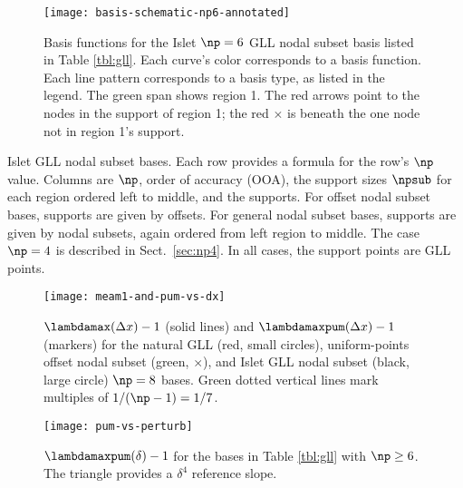 \begin{figure}[tbh]
  \centering
  \texttt{[image: basis-schematic-np6-annotated]}
  \caption{
    Basis functions for the Islet $\np=6$ GLL nodal subset basis listed in Table \ref{tbl:gll}.
    Each curve's color corresponds to a basis function.
    Each line pattern corresponds to a basis type, as listed in the legend.
    The green span shows region 1.
    The red arrows point to the nodes in the support of region 1;
    the red $\times$ is beneath the one node not in region 1's support.
  }
  \label{fig:np6-basis}
\end{figure}

\begin{table}[tbh]
  
  \caption{
    Islet GLL nodal subset bases.
    Each row provides a formula for the row's $\np$ value.
    Columns are $\np$, order of accuracy (OOA),
    the support sizes $\npsub$ for each region ordered left to middle,
    and the supports.
    For offset nodal subset bases, supports are given by offsets.
    For general nodal subset bases, supports are given by nodal subsets, again ordered from left region to middle.
    The case $\np=4$ is described in Sect.~\ref{sec:np4}.
    In all cases, the support points are GLL points.
  }
  \label{tbl:gll}
\end{table}

\begin{figure}[tbh]
  \centering
  \texttt{[image: meam1-and-pum-vs-dx]}
  \caption{
    $\lambdamax(\Delta x)-1$ (solid lines) and $\lambdamaxpum(\Delta x)-1$ (markers) for
    the natural GLL (red, small circles), uniform-points offset nodal subset (green, $\times$), and
    Islet GLL nodal subset (black, large circle) $\np=8$ bases.
    Green dotted vertical lines mark multiples of $1/(\np-1)=1/7$.
  }
  \label{fig:meam1-and-pum-vs-dx}
\end{figure}

\begin{figure}[tbh]
  \centering
  \texttt{[image: pum-vs-perturb]}
  \caption{
    $\lambdamaxpum(\delta)-1$ for the bases in Table \ref{tbl:gll} with $\np \ge 6$.
    The triangle provides a $\delta^4$ reference slope.
  }
  \label{fig:pum-vs-perturb}
\end{figure}

